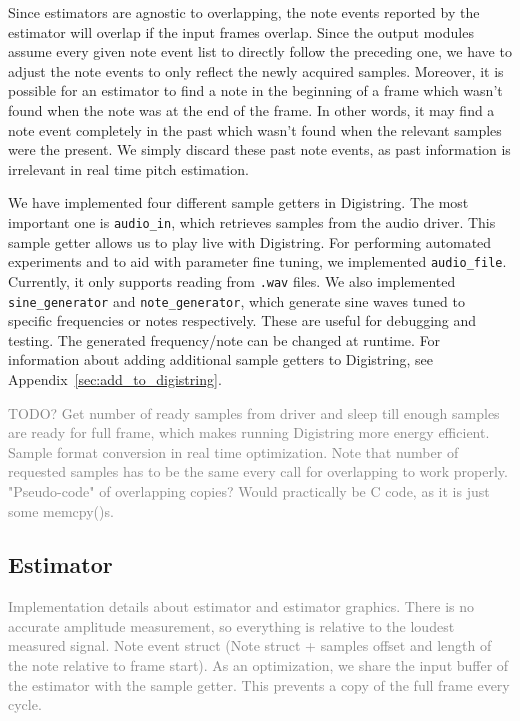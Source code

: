 \documentclass[10pt,twocolumn]{article}
\begin{document}
Since estimators are agnostic to overlapping, the note events reported by the estimator will overlap if the input frames overlap. Since the output modules assume every given note event list to directly follow the preceding one, we have to adjust the note events to only reflect the newly acquired samples. Moreover, it is possible for an estimator to find a note in the beginning of a frame which wasn't found when the note was at the end of the frame. In other words, it may find a note event completely in the past which wasn't found when the relevant samples were the present. We simply discard these past note events, as past information is irrelevant in real time pitch estimation.

We have implemented four different sample getters in Digistring. The most important one is \texttt{audio\_in}, which retrieves samples from the audio driver. This sample getter allows us to play live with Digistring. For performing automated experiments and to aid with parameter fine tuning, we implemented \texttt{audio\_file}. Currently, it only supports reading from \texttt{.wav} files. We also implemented \texttt{sine\_generator} and \texttt{note\_generator}, which generate sine waves tuned to specific frequencies or notes respectively. These are useful for debugging and testing. The generated frequency/note can be changed at runtime. For information about adding additional sample getters to Digistring, see Appendix~\ref{sec:add_to_digistring}.

\textcolor{gray}{TODO? Get number of ready samples from driver and sleep till enough samples are ready for full frame, which makes running Digistring more energy efficient. Sample format conversion in real time optimization. Note that number of requested samples has to be the same every call for overlapping to work properly. "Pseudo-code" of overlapping copies? Would practically be C code, as it is just some memcpy()s.}


\subsection{Estimator}
\textcolor{gray}{Implementation details about estimator and estimator graphics. There is no accurate amplitude measurement, so everything is relative to the loudest measured signal. Note event struct (Note struct + samples offset and length of the note relative to frame start). As an optimization, we share the input buffer of the estimator with the sample getter. This prevents a copy of the full frame every cycle.}
\end{document}
